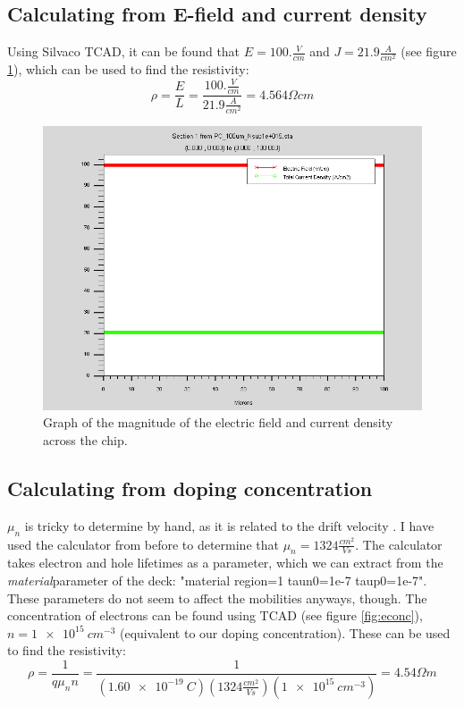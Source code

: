 \documentclass[12pt]{article}
\begin{document}
\subsection{Calculating from E-field and current density}
Using Silvaco TCAD, it can be found that $E=100.\frac{V}{cm}$ and $J=21.9\frac{A}{cm^2}$ (see figure \ref{fig:efieldcurrentdensity}), which can be used to find the resistivity:
\begin{equation}
  \rho=\frac{E}{L}=\frac{100.\frac{V}{cm}}{21.9\frac{A}{cm^2}}=4.564{\Omega}cm
\end{equation}
\begin{figure}[ht]
  \centering
  \includegraphics[width=\textwidth]{efieldcurrentdensity}
  \caption{Graph of the magnitude of the electric field and current density across the chip.}
  \label{fig:efieldcurrentdensity}
\end{figure}

\subsection{Calculating from doping concentration}
$\mu_n$ is tricky to determine by hand, as it is related to the drift velocity \citep{wikipedia_mobility}. I have used the calculator from before to determine that $\mu_n=1324\frac{cm^2}{Vs}$. The calculator takes electron and hole lifetimes as a parameter, which we can extract from the \emph{material}parameter of the deck: "material region=1 taun0=1e-7 taup0=1e-7". These parameters do not seem to affect the mobilities anyways, though. The concentration of electrons can be found using TCAD (see figure \ref{fig:econc}), $n=\SI{1e15}{cm^{-3}}$ (equivalent to our doping concentration). These can be used to find the resistivity:
\begin{equation}
  \rho=\frac{1}{q\mu_nn}=\frac{1}{(\SI{1.60e-19}{C})(1324\frac{cm^2}{Vs})(\SI{1e15}{cm^{-3}})}=4.54{\Omega}m
\end{equation}
\end{document}
